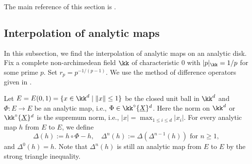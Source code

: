     The main reference of this section is \cite{Amerik11nonpreperiodic,BGT10DMLetale,Poonen14interpolation,Xie25ZDOsurfaces}.


\subsection{Interpolation of analytic maps}

    In this subsection, we find the interpolation of analytic maps on an analytic disk.
    Fix a complete non-archimedean field \(\kk\) of characteristic \(0\) with \(|p|_{\kk} = 1/p\) for some prime \(p\).
    Set \(r_p = p^{-1/(p-1)}\).
    We use the method of difference operators given in \cite{Poonen14interpolation}.

    Let \(E = E(0,1) = \{x \in \kk^d \mid \|x\| \leq 1\}\) be the closed unit ball in \(\kk^d\) and \(\Phi: E \to E\) be an analytic map, i.e., \(\Phi \in \kk^\circ\{ \underline{X} \}^d\).
    Here the norm on \(\kk^d\) or \(\kk^\circ\{ \underline{X} \}^d\) is the supremum norm, i.e., \(|x| = \max_{1 \leq i \leq d} |x_i|\).
    For every analytic map \(h\) from \(E\) to \(E\), we define
    \[ \Delta(h) := h \circ \Phi - h, \quad \Delta^n(h) := \Delta(\Delta^{n-1}(h)) \text{ for } n \geq 1, \]
    and \(\Delta^0(h) = h\).
    Note that \(\Delta^n(h)\) is still an analytic map from \(E\) to \(E\) by the strong triangle inequality.

